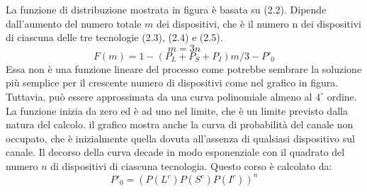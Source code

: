 \documentclass[a4paper]{report} %
\begin{document}
La funzione di distribuzione mostrata in figura è basata su (2.2). Dipende dall'aumento del numero totale $m$ dei dispositivi, che è il numero n dei dispositivi di ciascuna delle tre tecnologie (2.3), (2.4) e (2.5).
\begin{equation}
m = 3n 
\end{equation}
\begin{equation}
F(m) = 1 - (P_L+P_S+P_I)m/3 - P'_0 
\end{equation}
Essa non è una funzione lineare del processo come potrebbe sembrare la soluzione più semplice per il crescente numero di dispositivi come nel grafico in figura. Tuttavia, può essere approssimata da una curva polinomiale almeno al $4^{\circ}$ ordine. La funzione inizia da zero ed è ad uno nel limite, che è un limite previsto dalla natura del calcolo. il grafico mostra anche la curva di probabilità del canale non occupato, che è inizialmente quella dovuta all'assenza di qualsiasi dispositivo sul canale. Il decorso della curva decade in modo esponenziale con il quadrato del numero $n$ di dispositivi di ciascuna tecnologia. Questo corso è calcolato da:
\begin{equation}
P'_0 = (P(L^c)P(S^c)P(I^c))^n 
\end{equation}
\cite{art:rif.46}
\end{document}
